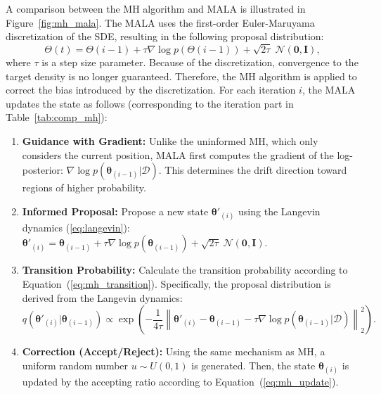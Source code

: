 A comparison between the \ac{MH} algorithm and \ac{MALA} is illustrated in Figure~\ref{fig:mh_mala}. The \ac{MALA} uses the first-order Euler-Maruyama discretization of the \ac{SDE}, resulting in the following proposal distribution:
\begin{equation}
    \label{eq:langevin}
    \mathit{\Theta}(t) = \mathit{\Theta}(i-1) + \tau \nabla \log p(\mathit{\Theta}(i-1)) + \sqrt{2\tau}\; \mathcal{N}(\boldsymbol{0}, \boldsymbol{I}),
\end{equation}
where $\tau$ is a step size parameter.
Because of the discretization, convergence to the target density is no longer guaranteed. Therefore, the \ac{MH} algorithm is applied to correct the bias introduced by the discretization. 
For each iteration $i$, the \ac{MALA} updates the state as follows (corresponding to the iteration part in Table~\ref{tab:comp_mh}):
\begin{enumerate}[noitemsep,topsep=2pt]
    \item[(a)] \textbf{Guidance with Gradient:} Unlike the uninformed \ac{MH}, which only considers the current position, \ac{MALA} first computes the gradient of the log-posterior: $\nabla \log p(\boldsymbol{\theta}_{(i-1)}|\mathcal{D})$. This determines the drift direction toward regions of higher probability.
    \item[(b)] \textbf{Informed Proposal:} Propose a new state $\boldsymbol{\theta}'_{(i)}$ using the Langevin dynamics (\ref{eq:langevin}): $\boldsymbol{\theta}'_{(i)} = \boldsymbol{\theta}_{(i-1)} + \tau \nabla \log p(\boldsymbol{\theta}_{(i-1)}) + \sqrt{2\tau}\; \mathcal{N}(\boldsymbol{0}, \boldsymbol{I})$.
    \item[(c)] \textbf{Transition Probability:} Calculate the transition probability according to Equation~(\ref{eq:mh_transition}). Specifically, the proposal distribution is derived from the Langevin dynamics:
    \begin{equation}
        q(\boldsymbol{\theta}'_{(i)}|\boldsymbol{\theta}_{(i-1)})\propto \exp(-\frac{1}{4\tau}\left\|\boldsymbol{\theta}'_{(i)}-\boldsymbol{\theta}_{(i-1)}-\tau\nabla\log p(\boldsymbol{\theta}_{(i-1)}|\mathcal{D})\right\|^2_2).
    \end{equation}
    \item[(d)] \textbf{Correction (Accept/Reject):} Using the same mechanism as MH, a uniform random number $u \sim U(0,1)$ is generated. Then, the state $\boldsymbol{\theta}_{(i)}$ is updated by the accepting ratio according to Equation~(\ref{eq:mh_update}). 
\end{enumerate}

